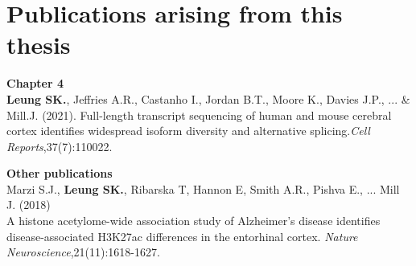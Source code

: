 \chapter*{Publications arising from this thesis}

\textbf{Chapter 4} \\
\textbf{Leung SK.}, Jeffries A.R., Castanho I., Jordan B.T., Moore K., Davies J.P., ... \& Mill.J. (2021). Full-length transcript sequencing of human and mouse cerebral cortex identifies widespread isoform diversity and alternative splicing.\textit{Cell Reports},37(7):110022.

\textbf{Other publications} \\
Marzi S.J., \textbf{Leung SK.}, Ribarska T, Hannon E, Smith A.R., Pishva E., ... Mill J. (2018) \\ A histone acetylome-wide association study of Alzheimer's disease identifies disease-associated H3K27ac differences in the entorhinal cortex. \textit{Nature Neuroscience},21(11):1618-1627.
